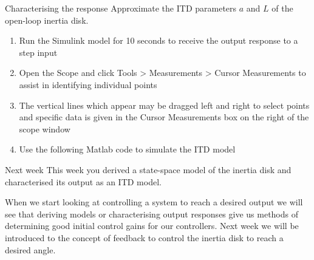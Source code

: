 \documentclass[9pt]{beamer-control}
\begin{document}
\begin{frame}{Characterising the response}
	Approximate the ITD parameters $a$ and $L$ of the open-loop inertia disk.
	\begin{enumerate}
		\item Run the Simulink model for 10 seconds to receive the output response to a step input
		\item Open the Scope and click Tools > Measurements > Cursor Measurements to assist in identifying individual points
		\item The vertical lines which appear may be dragged left and right to select points and specific data is given in the Cursor Measurements box on the right of the scope window
		\item Use the following Matlab code to simulate the ITD model
		\end{enumerate}
\end{frame}


\begin{frame}{Next week}
	This week you derived a state-space model of the inertia disk and characterised its output as an ITD model.
		
	When we start looking at controlling a system to reach a desired output we will see that deriving models or characterising output responses give us methods of determining good initial control gains for our controllers. Next week we will be introduced to the concept of feedback to control the inertia disk to reach a desired angle. 
\end{frame}
\end{document}
